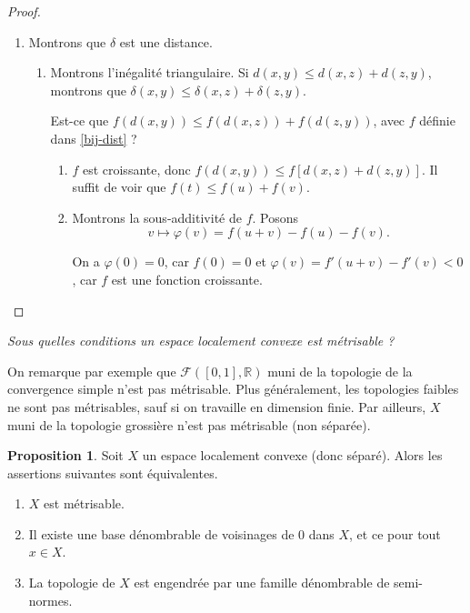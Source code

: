 \documentclass[french]{book}
\theoremstyle{definition}
\newtheorem{protoproposition}{Proposition}[section]
\newenvironment{prop}
    {\colorlet{shadecolor}{blue!5}\begin{shaded}\begin{protoproposition}}
    {\end{protoproposition}\end{shaded}}
\theoremstyle{remark}
\newcommand{\lesss}{<}
\newcommand{\less}{\lesss}
\begin{document}
\begin{proof}
\begin{enumerate}
    \item Montrons que $\delta$ est une distance.

    \begin{enumerate}
      \item Montrons l'inégalité triangulaire. Si $d(x,y) \leq d(x,z) + d(z,y)$, montrons que $\delta(x,y) \leq \delta(x,z) + \delta(z,y)$.

      Est-ce que \(f(d(x,y)) \leq f(d(x,z))+ f(d(z,y))\), avec \(f\) définie dans \ref{bij-dist} ?

      \begin{enumerate}
        \item $f$ est croissante, donc \(f(d(x,y)) \leq f[d(x,z) + d(z,y)]\). Il suffit de voir que $f(t) \leq f(u)+f(v)$.

        \item Montrons la sous-additivité de $f$. Posons \[v  \mapsto \varphi(v) =  f(u+v) - f(u) - f(v). \]

        On a \(\varphi(0) = 0\), car \(f(0) =0\) et \(\varphi(v) = f'(u+v) - f'(v) \less 0\), car $f$ est une fonction croissante.
      \end{enumerate}
    \end{enumerate}
  \end{enumerate}
\end{proof}

\emph{Sous quelles conditions un espace localement convexe est métrisable ?}

On remarque par exemple que $\mathscr{F}([0, 1], \mathbb{R})$ muni de la topologie de la convergence simple n'est pas métrisable. Plus généralement, les topologies faibles ne sont pas métrisables, sauf si on travaille en dimension finie. Par ailleurs, \(X\) muni de la topologie grossière n'est pas métrisable (non séparée).

\begin{prop}\label{elc-metr}
  Soit \(X\) un espace localement convexe (donc séparé). Alors les assertions suivantes sont équivalentes.

  \begin{enumerate}
    \item \(X\) est métrisable.
    \item Il existe une base dénombrable de voisinages de 0 dans \(X\), et ce pour tout \(x \in X\).
    \item La topologie de \(X\) est engendrée par une famille dénombrable de semi-normes.
  \end{enumerate}
\end{prop}
\end{document}
